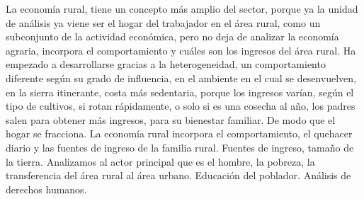 \documentclass[
  letterpaper,
  DIV=11,
  numbers=noendperiod]{scrartcl}
\begin{document}
La economía rural, tiene un concepto más amplio del sector, porque ya la
unidad de análisis ya viene ser el hogar del trabajador en el área
rural, como un subconjunto de la actividad económica, pero no deja de
analizar la economía agraria, incorpora el comportamiento y cuáles son
los ingresos del área rural. Ha empezado a desarrollarse gracias a la
heterogeneidad, un comportamiento diferente según su grado de
influencia, en el ambiente en el cual se desenvuelven, en la sierra
itinerante, costa más sedentaria, porque los ingresos varían, según el
tipo de cultivos, si rotan rápidamente, o solo si es una cosecha al año,
los padres salen para obtener más ingresos, para su bienestar familiar.
De modo que el hogar se fracciona. La economía rural incorpora el
comportamiento, el quehacer diario y las fuentes de ingreso de la
familia rural. Fuentes de ingreso, tamaño de la tierra. Analizamos al
actor principal que es el hombre, la pobreza, la transferencia del área
rural al área urbano. Educación del poblador. Análisis de derechos
humanos.
\end{document}

